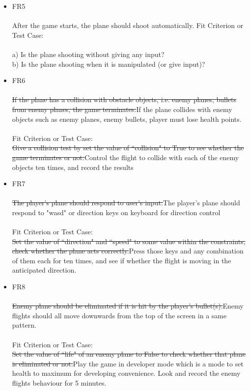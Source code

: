 \documentclass[12pt, titlepage]{article}
\begin{document}
\begin{itemize}
    \item FR5\\\\
     After the game starts, the plane should shoot automatically.
    Fit Criterion or Test Case:\\\\
    a) Is the plane shooting without giving any input?\\
    b) Is the plane shooting when it is manipulated (or give input)?
    \item FR6\\\\ 
    \sout{If the plane has a collision with obstacle objects, i.e. enemy planes, bullets from enemy planes, the game terminates.}{\color{red}If the plane collides with enemy objects such as enemy planes, enemy bullets, player must lose health points.}\\\\
    Fit Criterion or Test Case:\\
    \sout{Give a collision test by set the value of ``collision" to True to see whether the game terminates or not.}{\color{red}Control the flight to collide with each of the enemy objects ten times, and record the results}
    \item FR7\\\\
     \sout{The player's plane should respond to user's input.}{\color{red}The player's plane should respond to "wasd" or direction keys on keyboard for direction control}\\\\
    Fit Criterion or Test Case:\\
    \sout{Set the value of ``direction" and ``speed" to some value within the constraints, check whether the plane acts correctly.}{\color{red}Press those keys and any combination of them each for ten times, and see if whether the flight is moving in the anticipated direction.}
    \item FR8\\\\
    \sout{Enemy plane should be eliminated if it is hit by the player's bullet(s).}{\color{red}Enemy flights should all move downwards from the top of the screen in a same pattern.}\\\\
    Fit Criterion or Test Case:\\
    \sout{Set the value of ``life" of an enemy plane to False to check whether that plane is eliminated or not.}{\color{red}Play the game in developer mode which is a mode to set health to maximum for developing convenience. Look and record the enemy flights behaviour for 5 minutes.}

\end{itemize}
\end{document}
